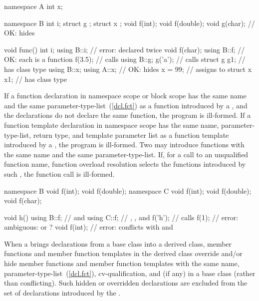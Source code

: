 \begin{codeblock}
namespace A {
  int x;
}

namespace B {
  int i;
  struct g { };
  struct x { };
  void f(int);
  void f(double);
  void g(char);     // OK: hides 
}

void func() {
  int i;
  using B::i;       // error:  declared twice
  void f(char);
  using B::f;       // OK: each  is a function
  f(3.5);           // calls 
  using B::g;
  g('a');           // calls 
  struct g g1;      //  has class type 
  using B::x;
  using A::x;       // OK: hides 
  x = 99;           // assigns to 
  struct x x1;      //  has class type 
}
\end{codeblock}
\exitexample

\pnum
If a function declaration in namespace scope or block scope has the same
name and the same parameter-type-list~(\ref{dcl.fct}) as
a function introduced by a , and the
declarations do not declare the same function, the program is
ill-formed. If a function template declaration in namespace scope has
the same name, parameter-type-list, return type, and template
parameter list as a function template introduced by a
, the program is ill-formed.
\enternote
Two  may introduce functions with the same
name and the same parameter-type-list. If, for a call to an unqualified
function name, function overload resolution selects the functions
introduced by such , the function call is
ill-formed.
\enterexample

\begin{codeblock}
namespace B {
  void f(int);
  void f(double);
}
namespace C {
  void f(int);
  void f(double);
  void f(char);
}

void h() {
  using B::f;       //  and 
  using C::f;       // , , and 
  f('h');           // calls 
  f(1);             // error: ambiguous:  or ?
  void f(int);      // error:  conflicts with  and 
}
\end{codeblock}
\exitexample
\exitnote

\pnum
{}%
When a  brings declarations from a base class into
a derived class, member functions and member function templates in
the derived class override and/or hide member functions and member
function templates with the same name,
parameter-type-list~(\ref{dcl.fct}), cv-qualification, and  (if any) in a base
class (rather than conflicting).
Such hidden or overridden declarations are excluded from the set of
declarations introduced by the .
\enterexample

